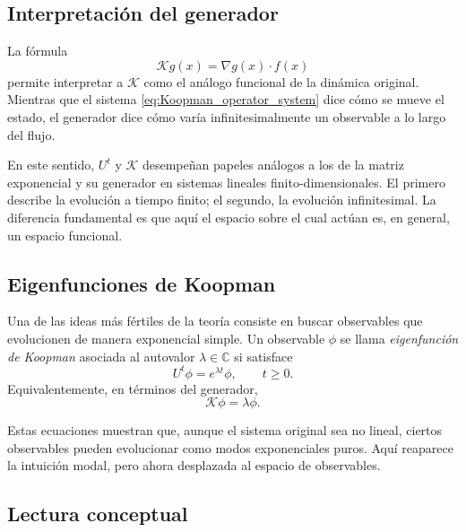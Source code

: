 \subsection{Interpretación del generador}

La fórmula
\begin{equation}
\mathcal{K}g(x)=\nabla g(x)\cdot f(x)
\label{eq:Koopman_generator_repeat}
\end{equation}
permite interpretar a \(\mathcal{K}\) como el análogo funcional de la dinámica original. Mientras que el sistema \eqref{eq:Koopman_operator_system} dice cómo se mueve el estado, el generador dice cómo varía infinitesimalmente un observable a lo largo del flujo.

En este sentido, \(U^t\) y \(\mathcal{K}\) desempeñan papeles análogos a los de la matriz exponencial y su generador en sistemas lineales finito-dimensionales. El primero describe la evolución a tiempo finito; el segundo, la evolución infinitesimal. La diferencia fundamental es que aquí el espacio sobre el cual actúan es, en general, un espacio funcional.

\subsection{Eigenfunciones de Koopman}

Una de las ideas más fértiles de la teoría consiste en buscar observables que evolucionen de manera exponencial simple. Un observable \(\phi\) se llama \emph{eigenfunción de Koopman} asociada al autovalor \(\lambda\in\mathbb{C}\) si satisface
\begin{equation}
U^t\phi=e^{\lambda t}\phi,
\qquad
t\ge 0.
\label{eq:Koopman_eigenfunction_definition}
\end{equation}
Equivalentemente, en términos del generador,
\begin{equation}
\mathcal{K}\phi=\lambda\phi.
\label{eq:Koopman_generator_eigenvalue_problem}
\end{equation}

Estas ecuaciones muestran que, aunque el sistema original sea no lineal, ciertos observables pueden evolucionar como modos exponenciales puros. Aquí reaparece la intuición modal, pero ahora desplazada al espacio de observables.

\subsection{Lectura conceptual}

